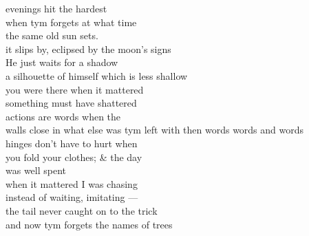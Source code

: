 evenings hit the hardest\\
when tym forgets at what time\\
the same old sun sets.\\
it slips by, eclipsed by the moon's signs\\
He just waits for a shadow\\
a silhouette of himself which is less shallow\\
you were there when it mattered\\
something must have shattered\\

actions are words when the\\
walls close in what else was tym left
with then words words and words\\
hinges don't have to hurt when\\
you fold your clothes; \& the day\\
was well spent\\

when it mattered I was chasing\\
instead of waiting, imitating --- \\
the tail never caught on to the trick\\
and now tym forgets the names of trees\\
